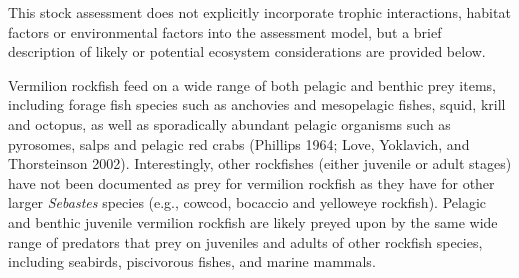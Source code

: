 \documentclass[11pt,
  english,
  a4paper,
]{article}
\begin{document}
This stock assessment does not explicitly incorporate trophic interactions, habitat factors or environmental factors into the assessment model, but a brief description of likely or potential ecosystem considerations are provided below.

\leavevmode\tagmcend\tagstructend\par


Vermilion rockfish feed on a wide range of both pelagic and benthic prey items, including forage fish species such as anchovies and mesopelagic fishes, squid, krill and octopus, as well as sporadically abundant pelagic organisms such as pyrosomes, salps and pelagic red crabs {(Phillips 1964; Love, Yoklavich, and Thorsteinson 2002)\leavevmode\tagmcend\tagstructend}. Interestingly, other rockfishes (either juvenile or adult stages) have not been documented as prey for vermilion rockfish as they have for other larger \emph{Sebastes} species (e.g., cowcod, bocaccio and yelloweye rockfish). Pelagic and benthic juvenile vermilion rockfish are likely preyed upon by the same wide range of predators that prey on juveniles and adults of other rockfish species, including seabirds, piscivorous fishes, and marine mammals.

\leavevmode\tagmcend\tagstructend\par

\end{document}
